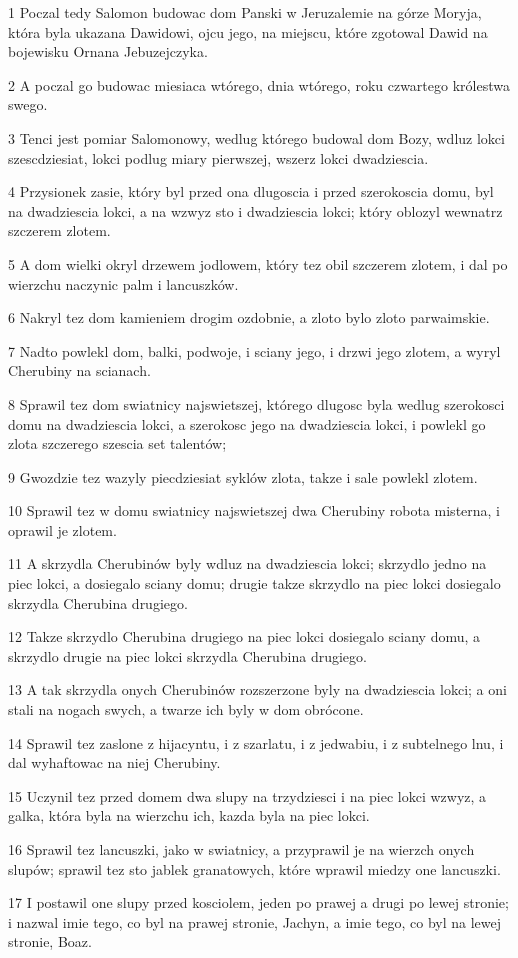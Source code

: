 \par 1 Poczal tedy Salomon budowac dom Panski w Jeruzalemie na górze Moryja, która byla ukazana Dawidowi, ojcu jego, na miejscu, które zgotowal Dawid na bojewisku Ornana Jebuzejczyka.
\par 2 A poczal go budowac miesiaca wtórego, dnia wtórego, roku czwartego królestwa swego.
\par 3 Tenci jest pomiar Salomonowy, wedlug którego budowal dom Bozy, wdluz lokci szescdziesiat, lokci podlug miary pierwszej, wszerz lokci dwadziescia.
\par 4 Przysionek zasie, który byl przed ona dlugoscia i przed szerokoscia domu, byl na dwadziescia lokci, a na wzwyz sto i dwadziescia lokci; który oblozyl wewnatrz szczerem zlotem.
\par 5 A dom wielki okryl drzewem jodlowem, który tez obil szczerem zlotem, i dal po wierzchu naczynic palm i lancuszków.
\par 6 Nakryl tez dom kamieniem drogim ozdobnie, a zloto bylo zloto parwaimskie.
\par 7 Nadto powlekl dom, balki, podwoje, i sciany jego, i drzwi jego zlotem, a wyryl Cherubiny na scianach.
\par 8 Sprawil tez dom swiatnicy najswietszej, którego dlugosc byla wedlug szerokosci domu na dwadziescia lokci, a szerokosc jego na dwadziescia lokci, i powlekl go zlota szczerego szescia set talentów;
\par 9 Gwozdzie tez wazyly piecdziesiat syklów zlota, takze i sale powlekl zlotem.
\par 10 Sprawil tez w domu swiatnicy najswietszej dwa Cherubiny robota misterna, i oprawil je zlotem.
\par 11 A skrzydla Cherubinów byly wdluz na dwadziescia lokci; skrzydlo jedno na piec lokci, a dosiegalo sciany domu; drugie takze skrzydlo na piec lokci dosiegalo skrzydla Cherubina drugiego.
\par 12 Takze skrzydlo Cherubina drugiego na piec lokci dosiegalo sciany domu, a skrzydlo drugie na piec lokci skrzydla Cherubina drugiego.
\par 13 A tak skrzydla onych Cherubinów rozszerzone byly na dwadziescia lokci; a oni stali na nogach swych, a twarze ich byly w dom obrócone.
\par 14 Sprawil tez zaslone z hijacyntu, i z szarlatu, i z jedwabiu, i z subtelnego lnu, i dal wyhaftowac na niej Cherubiny.
\par 15 Uczynil tez przed domem dwa slupy na trzydziesci i na piec lokci wzwyz, a galka, która byla na wierzchu ich, kazda byla na piec lokci.
\par 16 Sprawil tez lancuszki, jako w swiatnicy, a przyprawil je na wierzch onych slupów; sprawil tez sto jablek granatowych, które wprawil miedzy one lancuszki.
\par 17 I postawil one slupy przed kosciolem, jeden po prawej a drugi po lewej stronie; i nazwal imie tego, co byl na prawej stronie, Jachyn, a imie tego, co byl na lewej stronie, Boaz.

